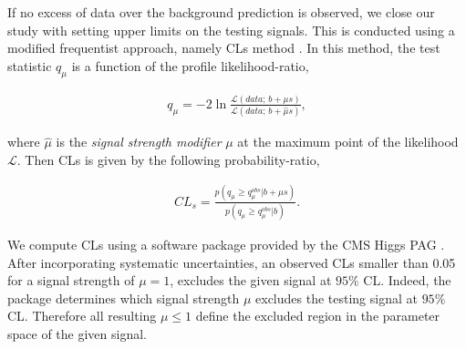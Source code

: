 If no excess of data over the background prediction is observed, 
we close our study with setting upper limits on the testing signals.
This is conducted using a modified frequentist approach, namely CLs method \cite{read:CLs}.
In this method, the test statistic $q_\mu$ 
is a function of the profile likelihood-ratio,

\begin{align}
q_\mu = -2 \ln \frac{\mathcal{L}(data ;\, b + \mu s)}{\mathcal{L}(data ;\, b + \hat{\mu} s)},
\end{align}

where $\hat\mu$ is the \textit{signal strength modifier} $\mu$ at the maximum point of the likelihood $\mathcal{L}$.
Then CLs is given by the following probability-ratio,

\begin{align}
CL_s = \frac{p(q_\mu \geq q_\mu^{obs} | b + \mu s )}{p(q_\mu \geq q_\mu^{obs} | b)}.
\end{align}
 
We compute CLs using a software package provided by the CMS Higgs PAG \cite{higgspag:software}.
After incorporating systematic uncertainties, an observed CLs smaller than 0.05 for a signal strength of $\mu = 1$, excludes the given signal at $95\%$ CL. Indeed, the package determines which signal strength $\mu$ excludes the testing signal at $95\%$ CL. Therefore all resulting $\mu \leq 1$ define the excluded region in the parameter space of the given signal. 


